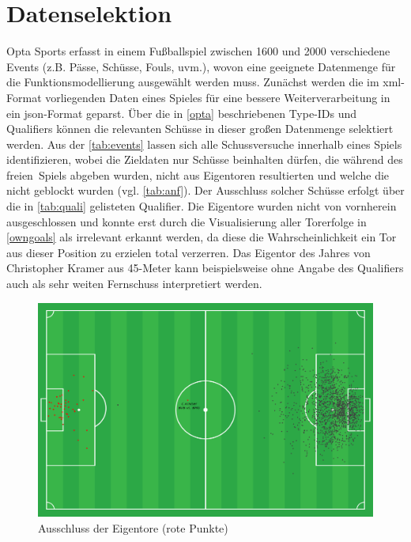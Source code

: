 \section{Datenselektion}
\label{ds}

Opta Sports erfasst in einem Fußballspiel zwischen 1600 und 2000 verschiedene Events (z.B. Pässe, Schüsse, Fouls, uvm.), wovon eine geeignete Datenmenge für die Funktionsmodellierung ausgewählt werden muss. Zunächst werden die im \gls{xml}-Format vorliegenden Daten eines Spieles für eine bessere Weiterverarbeitung in ein \gls{json}-Format geparst. Über die in \vref{opta} beschriebenen \textsf{Type-IDs} und \textsf{Qualifiers} können die relevanten Schüsse in dieser großen Datenmenge selektiert werden. Aus der \vref{tab:events} lassen sich alle Schussversuche innerhalb eines Spiels identifizieren, wobei die Zieldaten nur Schüsse beinhalten dürfen, die während des \glqq freien\grqq~Spiels abgeben wurden, nicht aus Eigentoren resultierten und welche die nicht geblockt wurden (vgl. \vref{tab:anf}). Der Ausschluss solcher Schüsse erfolgt über die in \vref{tab:quali} gelisteten Qualifier. Die Eigentore wurden nicht von vornherein ausgeschlossen und konnte erst durch die Visualisierung aller Torerfolge in \vref{owngoals} als irrelevant erkannt werden, da diese die Wahrscheinlichkeit ein Tor aus dieser Position zu erzielen total verzerren. \enlargethispage{2\baselineskip} Das \glqq Eigentor des Jahres\grqq{} von Christopher Kramer aus 45-Meter kann beispielsweise ohne Angabe des Qualifiers auch als sehr weiten Fernschuss interpretiert werden.


\begin{figure}
\centering
\includegraphics[scale=0.4]{se-wa-jpg/owngoals}
\caption[Ausschluss der Eigentore]{Ausschluss der Eigentore (rote Punkte) }
\label{owngoals}
\end{figure}

